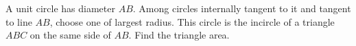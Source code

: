 A unit circle has diameter $AB$. Among circles internally tangent to it and tangent to line $AB$, choose one of largest radius. This circle is the incircle of a triangle $ABC$ on the same side of $AB$. Find the triangle area.
